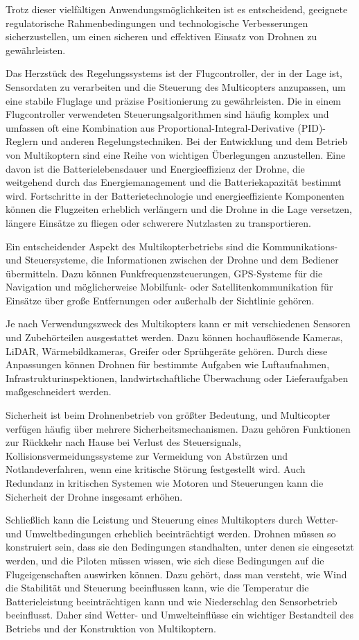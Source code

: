 Trotz dieser vielfältigen Anwendungsmöglichkeiten ist es entscheidend, geeignete regulatorische Rahmenbedingungen und technologische Verbesserungen sicherzustellen, um einen sicheren und effektiven Einsatz von Drohnen zu gewährleisten.


Das Herzstück des Regelungssystems ist der Flugcontroller, der in der Lage ist, Sensordaten zu verarbeiten und die Steuerung des Multicopters anzupassen, um eine stabile Fluglage und präzise Positionierung zu gewährleisten. Die in einem Flugcontroller verwendeten Steuerungsalgorithmen sind häufig komplex und umfassen oft eine Kombination aus Proportional-Integral-Derivative (PID)-Reglern und anderen Regelungstechniken.
Bei der Entwicklung und dem Betrieb von Multikoptern sind eine Reihe von wichtigen Überlegungen anzustellen. Eine davon ist die Batterielebensdauer und Energieeffizienz der Drohne, die weitgehend durch das Energiemanagement und die Batteriekapazität bestimmt wird. Fortschritte in der Batterietechnologie und energieeffiziente Komponenten können die Flugzeiten erheblich verlängern und die Drohne in die Lage versetzen, längere Einsätze zu fliegen oder schwerere Nutzlasten zu transportieren.

Ein entscheidender Aspekt des Multikopterbetriebs sind die Kommunikations- und Steuersysteme, die Informationen zwischen der Drohne und dem Bediener übermitteln. Dazu können Funkfrequenzsteuerungen, GPS-Systeme für die Navigation und möglicherweise Mobilfunk- oder Satellitenkommunikation für Einsätze über große Entfernungen oder außerhalb der Sichtlinie gehören.

Je nach Verwendungszweck des Multikopters kann er mit verschiedenen Sensoren und Zubehörteilen ausgestattet werden. Dazu können hochauflösende Kameras, LiDAR, Wärmebildkameras, Greifer oder Sprühgeräte gehören. Durch diese Anpassungen können Drohnen für bestimmte Aufgaben wie Luftaufnahmen, Infrastrukturinspektionen, landwirtschaftliche Überwachung oder Lieferaufgaben maßgeschneidert werden.

Sicherheit ist beim Drohnenbetrieb von größter Bedeutung, und Multicopter verfügen häufig über mehrere Sicherheitsmechanismen. Dazu gehören Funktionen zur Rückkehr nach Hause bei Verlust des Steuersignals, Kollisionsvermeidungssysteme zur Vermeidung von Abstürzen und Notlandeverfahren, wenn eine kritische Störung festgestellt wird. Auch Redundanz in kritischen Systemen wie Motoren und Steuerungen kann die Sicherheit der Drohne insgesamt erhöhen.

Schließlich kann die Leistung und Steuerung eines Multikopters durch Wetter- und Umweltbedingungen erheblich beeinträchtigt werden. Drohnen müssen so konstruiert sein, dass sie den Bedingungen standhalten, unter denen sie eingesetzt werden, und die Piloten müssen wissen, wie sich diese Bedingungen auf die Flugeigenschaften auswirken können. Dazu gehört, dass man versteht, wie Wind die Stabilität und Steuerung beeinflussen kann, wie die Temperatur die Batterieleistung beeinträchtigen kann und wie Niederschlag den Sensorbetrieb beeinflusst. Daher sind Wetter- und Umwelteinflüsse ein wichtiger Bestandteil des Betriebs und der Konstruktion von Multikoptern.

